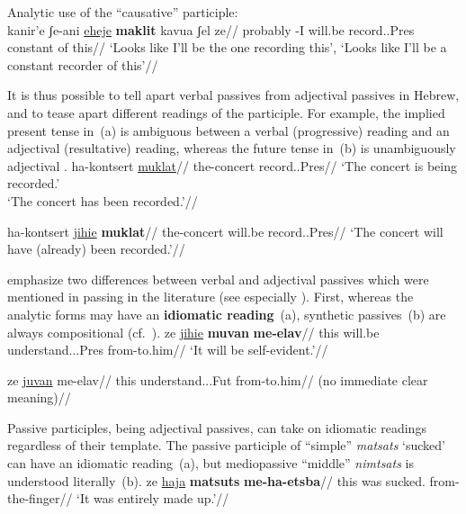  \a Analytic use of the ``causative'' participle:\\
 \begingl
     \gla kanir'e ʃe-ani \underline{eheje} \textbf{maklit} kavua ʃel ze//
     \glb probably -I will.be record..Pres constant of this//
     \glft `Looks like I'll be the one recording this', `Looks like I'll be a constant recorder of this'//
 \endgl
\xe

It is thus possible to tell apart verbal passives from adjectival passives in Hebrew, and to tease apart different readings of the participle. For example, the implied present tense in~(\nextx a) is ambiguous between a verbal (progressive) reading and an adjectival (resultative) reading, whereas the future tense in~(\nextx b) is unambiguously adjectival \citep{doron00,horvathsiloni08,meltzerasscher11}.
\pex \label{ex:pres-ambig}
    \a \begingl
        \gla ha-kontsert \underline{muklat}//
        \glb the-concert record..Pres//
        \glft `The concert is being recorded.'\\`The concert has been recorded.'//
    \endgl
        
    \a \begingl
        \gla ha-kontsert \underline{jihie} \textbf{muklat}//
        \glb the-concert will.be record..Pres//
        \glft `The concert will have (already) been recorded.'//
    \endgl
\xe

\cite{kastnerzu15li} emphasize two differences between verbal and adjectival passives which were mentioned in passing in the literature (see especially \citealt{meltzerasscher11}). First, whereas the analytic forms may have an \textbf{idiomatic reading}~(\nextx a), synthetic passives~(\nextx b) are always compositional (cf.~\citealt{horvathsiloni09}).
\pex \label{ex:idiom}
    \a 
        \begingl
        \gla {}ze \underline{jihie} \textbf{muvan} \textbf{me-elav}//
        \glb this will.be understand...Pres from-to.him//
        \glft `It will be self-evident.'//
        \endgl

    \a \ljudge{\#}
        \begingl
        \gla {}ze \underline{juvan} me-elav//
        \glb this understand...Fut from-to.him//
        \glft (no immediate clear meaning)//
        \endgl
\xe

Passive participles, being adjectival passives, can take on idiomatic readings regardless of their template. The passive participle of ``simple'' \emph{matsats} `sucked' can have an idiomatic reading~(\nextx a), but mediopassive ``middle'' \emph{nimtsats} is understood literally~(\nextx b).
\pex
    \a
        \begingl
        \gla {}ze \underline{haja} \textbf{matsuts} \textbf{me-ha-etsba}//
        \glb this was sucked. from-the-finger//
        \glft `It was entirely made up.'//
        \endgl
    
